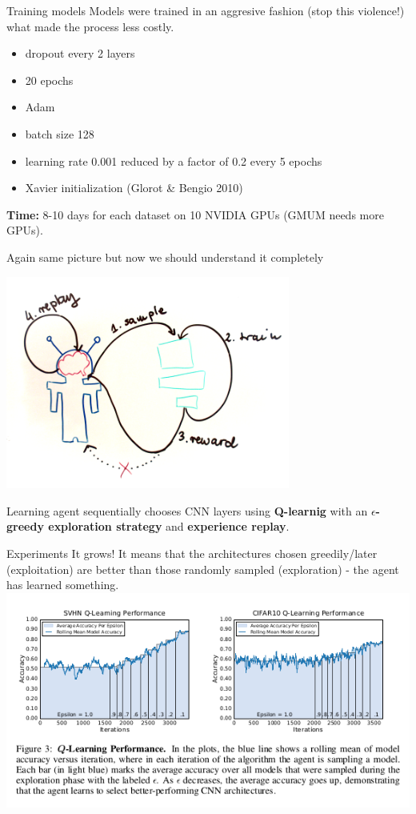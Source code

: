 \documentclass{beamer}
\begin{document}
\begin{frame}{Training models}
  Models were trained in an aggresive fashion (stop this violence!) what made the process less costly.
  \begin{itemize}
  \item dropout every 2 layers
  \item 20 epochs
  \item Adam
  \item batch size 128
  \item learning rate 0.001 reduced by a factor of 0.2 every 5 epochs
  \item Xavier initialization (Glorot \& Bengio 2010)
  \end{itemize}

  \textbf{Time:} 8-10 days for each dataset on 10 NVIDIA GPUs (GMUM needs more GPUs).
\end{frame}


\begin{frame}{Again same picture but now we should understand it completely}
  \begin{center}
  \includegraphics[width=0.7\textwidth]{model.png}  
  \end{center}
  
  Learning agent sequentially chooses CNN layers using \textbf{Q-learnig} with an \textbf{$\epsilon$-greedy exploration strategy} and \textbf{experience replay}.
\end{frame}

\begin{frame}{Experiments}
It grows! It means that the architectures chosen greedily/later (exploitation) are better than those randomly sampled (exploration) - the agent has learned something.
\includegraphics[width=\textwidth]{experiments.png}
\end{frame}
\end{document}
